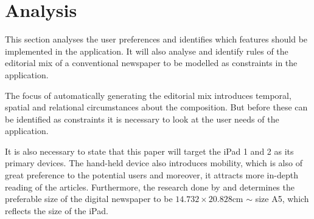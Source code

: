 \chapter{Analysis} %
\label{ch:analysis}
This section analyses the user preferences and identifies which features should be implemented in the application. It will also analyse and identify rules of the editorial mix of a conventional newspaper to be modelled as constraints in the application.

The focus of automatically generating the editorial mix introduces temporal, spatial and relational circumstances about the composition. But before these can be identified as constraints it is necessary to look at the user needs of the application.
%

It is also necessary to state that this paper will target the iPad 1 and 2 as its primary devices. The hand-held device also introduces mobility, which is also of great preference to the potential users and moreover, it attracts more in-depth reading of the articles. Furthermore, the research done by \cite{FULLTEXT01.pdf} and \cite{kristin-fredrik.pdf} determines the preferable size of the digital newspaper to be $14.732 \times 20.828$cm $\sim$ size A5, which reflects the size of the iPad.
%


